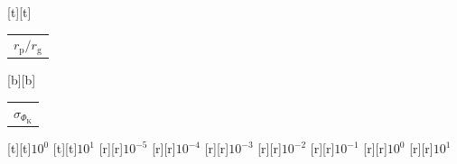 %    
%
%
\begin{psfrags}%
\psfragscanon%
%
[t][t]{\color[rgb]{0,0,0}\setlength{\tabcolsep}{0pt}\begin{tabular}{c}{\Large$r_\mathrm{p}/r_\mathrm{g}$}\end{tabular}}%
[b][b]{\color[rgb]{0,0,0}\setlength{\tabcolsep}{0pt}\begin{tabular}{c}{\Large$\sigma_{\Phi_\mathrm{K}}$}\end{tabular}}%
%
[t][t]{$10^{0}$}%
[t][t]{$10^{1}$}%
%
[r][r]{$10^{-5}$}%
[r][r]{$10^{-4}$}%
[r][r]{$10^{-3}$}%
[r][r]{$10^{-2}$}%
[r][r]{$10^{-1}$}%
[r][r]{$10^{0}$}%
[r][r]{$10^{1}$}%
%
%
\end{psfrags}%
%

